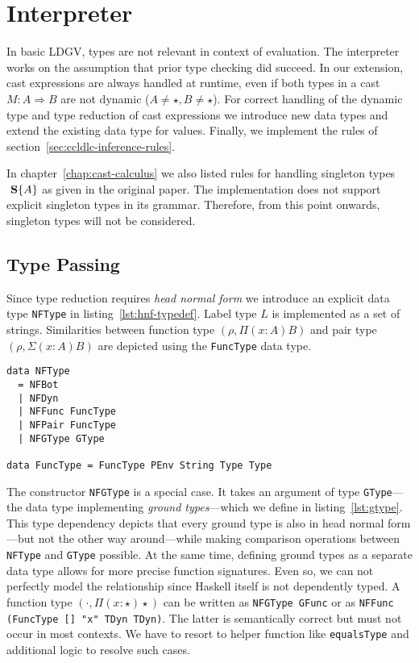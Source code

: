 \section{Interpreter}

In basic LDGV, types are not relevant in context of evaluation. The interpreter works on the assumption that prior type checking did succeed. In our extension, cast expressions are always handled at runtime, even if both types in a cast $M : A \Rightarrow B$ are not dynamic ($A \neq \star, B \neq \star$).
For correct handling of the dynamic type and type reduction of cast expressions we introduce new data types and extend the existing data type for values. Finally, we implement the rules of section~\ref{sec:ccldlc-inference-rules}.

In chapter~\ref{chap:cast-calculus} we also listed rules for handling singleton types $\text{ \textbf{S}}\{A\}$ as given in the original paper. The implementation does not support explicit singleton types in its grammar. Therefore, from this point onwards, singleton types will not be considered.

\subsection{Type Passing}

Since type reduction requires \emph{head normal form} we introduce an explicit data type \texttt{NFType} in listing~\ref{lst:hnf-typedef}. Label type $L$ is implemented as a set of strings. Similarities between function type $(\rho, \Pi(x:A)B)$ and pair type $(\rho, \Sigma(x:A)B)$ are  depicted using the \texttt{FuncType} data type.

\begin{lstlisting}[float,
  label=lst:hnf-typedef,
  caption=Haskell: HNF type definition (\texttt{ProcessEnvironment.hs})]
data NFType
  = NFBot
  | NFDyn
  | NFFunc FuncType
  | NFPair FuncType
  | NFGType GType

data FuncType = FuncType PEnv String Type Type
\end{lstlisting}

The constructor \texttt{NFGType} is a special case. It takes an argument of type \texttt{GType}---the data type implementing \emph{ground types}---which we define in listing~\ref{lst:gtype}. This type dependency depicts that every ground type is also in head normal form---but not the other way around---while making comparison operations between \texttt{NFType} and \texttt{GType} possible. At the same time, defining ground types as a separate data type allows for more precise function signatures. Even so, we can not perfectly model the relationship since Haskell itself is not dependently typed. A function type $(\cdot, \Pi(x:\star)\star)$ can be written as \texttt{NFGType GFunc} or as \texttt{NFFunc (FuncType [] "x" TDyn TDyn)}. The latter is semantically correct but must not occur in most contexts. We have to resort to helper function like \texttt{equalsType} and additional logic to resolve such cases.

